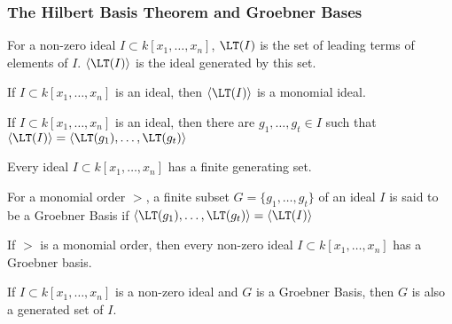 \documentclass[crop=false,class=book,oneside]{standalone}
\begin{document}
            \subsubsection{The Hilbert Basis Theorem and Groebner Bases}
                \begin{definition}
                    For a non-zero ideal $I\subset k[x_1,\hdots ,x_n]$,
                    $\LT(I)$ is the set of leading terms of elements
                    of $I$. $\langle \LT(I)\rangle$ is the ideal
                    generated by this set.
                \end{definition}
                \begin{theorem}
                    If $I\subset k[x_1,\hdots ,x_n]$ is an ideal,
                    then $\langle \LT(I)\rangle$ is a monomial ideal.
                \end{theorem}
                \begin{theorem}
                    If $I\subset k[x_1,\hdots ,x_n]$ is an ideal,
                    then there are $g_1,\hdots, g_t\in I$ such that
                    $\langle\LT(I)\rangle%
                     =\langle\LT(g_1),\hdots,\LT(g_t)\rangle$
                \end{theorem}
                \begin{theorem}
                    Every ideal $I\subset k[x_1,\hdots,x_n]$
                    has a finite generating set.
                \end{theorem}
                \begin{definition}
                    For a monomial order $>$, a finite subset
                    $G=\{g_1,\hdots, g_t\}$ of an ideal $I$ is
                    said to be a Groebner Basis if
                    $\langle\LT(g_1),\hdots,\LT(g_t)\rangle%
                     =\langle \LT(I)\rangle$
                \end{definition}
                \begin{theorem}
                    If $>$ is a monomial order, then every non-zero
                    ideal $I\subset k[x_1,\hdots,x_n]$ has a Groebner basis.
                \end{theorem}
                \begin{theorem}
                    If $I\subset k[x_1,\hdots ,x_n]$ is a non-zero
                    ideal and $G$ is a Groebner Basis, then $G$
                    is also a generated set of $I$.
                \end{theorem}
\end{document}
